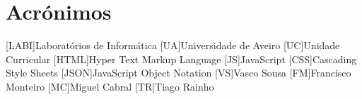 \documentclass{report}
\begin{document}
\chapter*{Acrónimos}
\begin{acronym}
[LABI]{Laboratórios de Informática}
[UA]{Universidade de Aveiro}
[UC]{Unidade Curricular}
[HTML]{Hyper Text Markup Language}
[JS]{JavaScript}
[CSS]{Cascading Style Sheets}
[JSON]{JavaScript Object Notation}
[VS]{Vasco Sousa}
[FM]{Francisco Monteiro}
[MC]{Miguel Cabral}
[TR]{Tiago Rainho}

\end{acronym}
\end{document}
